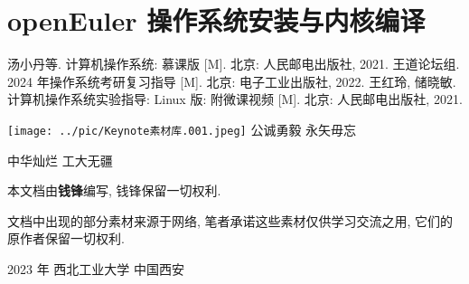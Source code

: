 \documentclass[10pt,UTF8]{book} %
\begin{document}

\pagestyle{plain}
{\tableofcontents}
\newpage
\thispagestyle{empty}
\cleardoublepage %


\makeatletter
\let\ps@plain\ps@empty
\makeatother

\mainmatter
\renewcommand{\chaptermark}[1]{\markboth{实验 \thechapter\hspace{1em} #1}{}} %
\renewcommand{\sectionmark}[1]{\markright{\thesection \, #1}} %

\chapter{openEuler 操作系统安装与内核编译}



\onecolumn
\begin{thebibliography}{1}
    汤小丹等. 计算机操作系统: 慕课版 [M]. 北京: 人民邮电出版社, 2021.
    王道论坛组. 2024 年操作系统考研复习指导 [M]. 北京: 电子工业出版社, 2022.
    王红玲, 储晓敏. 计算机操作系统实验指导: Linux 版: 附微课视频 [M].
    北京: 人民邮电出版社, 2021.
\end{thebibliography}

\newpage
\thispagestyle{empty}
\vspace*{4cm}
\begin{center}
    \texttt{[image: ../pic/Keynote素材库.001.jpeg]}
    \large
    公诚勇毅 \quad 永矢毋忘

    中华灿烂 \quad 工大无疆
\end{center}
\vspace*{5cm}
\begin{center}
    \small
    本文档由\textbf{钱锋}编写, 钱锋保留一切权利.

    文档中出现的部分素材来源于网络, 笔者承诺这些素材仅供学习交流之用, 
    它们的原作者保留一切权利.

    2023 年 \quad 西北工业大学 \quad 中国西安 
\end{center}
\end{document}
